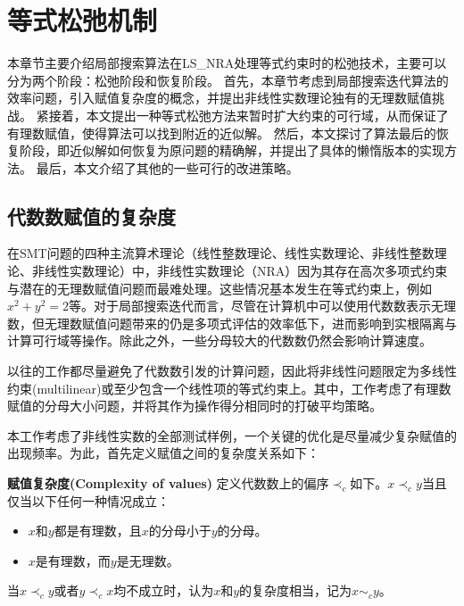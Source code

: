 \chapter{等式松弛机制}\label{chap:method2}

本章节主要介绍局部搜索算法在LS\_NRA处理等式约束时的松弛技术，主要可以分为两个阶段：松弛阶段和恢复阶段。
首先，本章节考虑到局部搜索迭代算法的效率问题，引入赋值复杂度的概念，并提出非线性实数理论独有的无理数赋值挑战。
紧接着，本文提出一种等式松弛方法来暂时扩大约束的可行域，从而保证了有理数赋值，使得算法可以找到附近的近似解。
然后，本文探讨了算法最后的恢复阶段，即近似解如何恢复为原问题的精确解，并提出了具体的懒惰版本的实现方法。
最后，本文介绍了其他的一些可行的改进策略。

\section{代数数赋值的复杂度}
在SMT问题的四种主流算术理论（线性整数理论、线性实数理论、非线性整数理论、非线性实数理论）中，非线性实数理论（NRA）因为其存在高次多项式约束与潜在的无理数赋值问题而最难处理。这些情况基本发生在等式约束上，例如$x^2 + y^2 = 2$等。对于局部搜索迭代而言，尽管在计算机中可以使用代数数表示无理数，但无理数赋值问题带来的仍是多项式评估的效率低下，进而影响到实根隔离与计算可行域等操作。除此之外，一些分母较大的代数数仍然会影响计算速度。

以往的工作\cite{multilinear,LiXZ23}都尽量避免了代数数引发的计算问题，因此将非线性问题限定为多线性约束(multilinear)或至少包含一个线性项的等式约束上。其中，工作\cite{multilinear}考虑了有理数赋值的分母大小问题，并将其作为操作得分相同时的打破平均策略。

本工作考虑了非线性实数的全部测试样例，一个关键的优化是尽量减少复杂赋值的出现频率。为此，首先定义赋值之间的复杂度关系如下：

\begin{definition}{\textbf{赋值复杂度(Complexity of values)}}
\label{def:complexity}
定义代数数上的偏序$\prec_c$如下。$x \prec_c y$当且仅当以下任何一种情况成立：

\begin{itemize}
    \item $x$和$y$都是有理数，且$x$的分母小于$y$的分母。
    \item $x$是有理数，而$y$是无理数。
\end{itemize}
当$x \prec_c y$或者$y \prec_c x$均不成立时，认为$x$和$y$的复杂度相当，记为$x \sim_c y$。
\end{definition}

